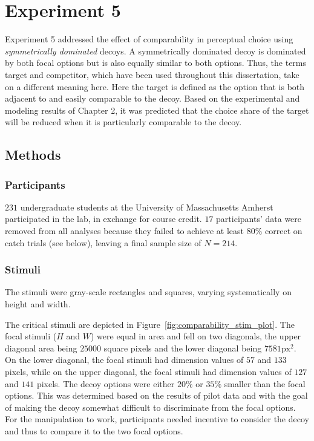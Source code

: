\section{Experiment 5}
Experiment 5 addressed the effect of comparability in perceptual choice using \textit{symmetrically dominated} decoys. A symmetrically dominated decoy is dominated by both focal options but is also equally similar to both options. Thus, the terms target and competitor, which have been used throughout this dissertation, take on a different meaning here. Here the target is defined as the option that is both adjacent to and easily comparable to the decoy. Based on the experimental and modeling results of Chapter 2, it was predicted that the choice share of the target will be reduced when it is particularly comparable to the decoy.

\subsection{Methods}

\subsubsection{Participants}
$231$ undergraduate students at the University of Massachusetts Amherst participated in the lab, in exchange for course credit. $17$ participants' data were removed from all analyses because they failed to achieve at least $80\%$ correct on catch trials (see below), leaving a final sample size of $N=214$. 

\subsubsection{Stimuli}
The stimuli were gray-scale rectangles and squares, varying systematically on height and width. 

The critical stimuli are depicted in Figure~\ref{fig:comparability_stim_plot}. The focal stimuli ($H$ and $W$) were equal in area and fell on two diagonals, the upper diagonal area being $25000$ square pixels and the lower diagonal being $7581\text{px}^2$. On the lower diagonal, the focal stimuli had dimension values of $57$ and $133$ pixels, while on the upper diagonal, the focal stimuli had dimension values of $127$ and $141$ pixels. 
The decoy options were either $20\%$ or $35\%$ smaller than the focal options. This was determined based on the results of pilot data and with the goal of making the decoy somewhat difficult to discriminate from the focal options. For the manipulation to work, participants needed incentive to consider the decoy and thus to compare it to the two focal options. 

